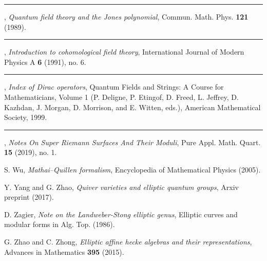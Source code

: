 \begin{description}[leftmargin=5.6em,labelwidth=5.2em,labelsep=0.4em,itemsep=0.5ex,parsep=0pt,topsep=0.8ex]
\item[\textbf{[Wit89]}] \rule[0.45ex]{2.6em}{0.45pt}, \textit{Quantum field theory and the Jones polynomial}, Commun. Math. Phys. \textbf{121} (1989).
\item[\textbf{[Wit91]}] \rule[0.45ex]{2.6em}{0.45pt}, \textit{Introduction to cohomological field theory}, International Journal of Modern Physics A \textbf{6} (1991), no. 6.
\item[\textbf{[Wit99]}] \rule[0.45ex]{2.6em}{0.45pt}, \textit{Index of Dirac operators}, Quantum Fields and Strings: A Course for Mathematicians, Volume 1 (P. Deligne, P. Etingof, D. Freed, L. Jeffrey, D. Kazhdan, J. Morgan, D. Morrison, and E. Witten, eds.), American Mathematical Society, 1999.
\item[\textbf{[Wit19]}] \rule[0.45ex]{2.6em}{0.45pt}, \textit{Notes On Super Riemann Surfaces And Their Moduli}, Pure Appl. Math. Quart. \textbf{15} (2019), no. 1.
\item[\textbf{[Wu05]}] S. Wu, \textit{Mathai--Quillen formalism}, Encyclopedia of Mathematical Physics (2005).
\item[\textbf{[YZ17]}] Y. Yang and G. Zhao, \textit{Quiver varieties and elliptic quantum groups}, Arxiv preprint (2017).
\item[\textbf{[Zag86]}] D. Zagier, \textit{Note on the Landweber-Stong elliptic genus}, Elliptic curves and modular forms in Alg. Top. (1986).
\item[\textbf{[ZZ15]}] G. Zhao and C. Zhong, \textit{Elliptic affine hecke algebras and their representations}, Advances in Mathematics \textbf{395} (2015).

\end{description}
